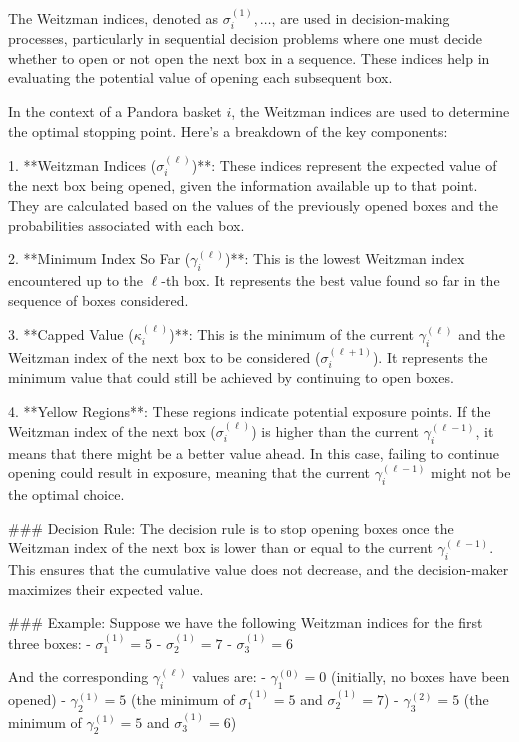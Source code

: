The Weitzman indices, denoted as \(\sigma_i^{(1)}, \dots\), are used in decision-making processes, particularly in sequential decision problems where one must decide whether to open or not open the next box in a sequence. These indices help in evaluating the potential value of opening each subsequent box.

In the context of a Pandora basket \(i\), the Weitzman indices are used to determine the optimal stopping point. Here's a breakdown of the key components:

1. **Weitzman Indices (\(\sigma_i^{(\ell)}\))**: These indices represent the expected value of the next box being opened, given the information available up to that point. They are calculated based on the values of the previously opened boxes and the probabilities associated with each box.

2. **Minimum Index So Far (\(\gamma_i^{(\ell)}\))**: This is the lowest Weitzman index encountered up to the \(\ell\)-th box. It represents the best value found so far in the sequence of boxes considered.

3. **Capped Value (\(\kappa_i^{(\ell)}\))**: This is the minimum of the current \(\gamma_i^{(\ell)}\) and the Weitzman index of the next box to be considered (\(\sigma_i^{(\ell+1)}\)). It represents the minimum value that could still be achieved by continuing to open boxes.

4. **Yellow Regions**: These regions indicate potential exposure points. If the Weitzman index of the next box (\(\sigma_i^{(\ell)}\)) is higher than the current \(\gamma_i^{(\ell-1)}\), it means that there might be a better value ahead. In this case, failing to continue opening could result in exposure, meaning that the current \(\gamma_i^{(\ell-1)}\) might not be the optimal choice.

### Decision Rule:
The decision rule is to stop opening boxes once the Weitzman index of the next box is lower than or equal to the current \(\gamma_i^{(\ell-1)}\). This ensures that the cumulative value does not decrease, and the decision-maker maximizes their expected value.

### Example:
Suppose we have the following Weitzman indices for the first three boxes:
- \(\sigma_1^{(1)} = 5\)
- \(\sigma_2^{(1)} = 7\)
- \(\sigma_3^{(1)} = 6\)

And the corresponding \(\gamma_i^{(\ell)}\) values are:
- \(\gamma_1^{(0)} = 0\) (initially, no boxes have been opened)
- \(\gamma_2^{(1)} = 5\) (the minimum of \(\sigma_1^{(1)} = 5\) and \(\sigma_2^{(1)} = 7\))
- \(\gamma_3^{(2)} = 5\) (the minimum of \(\gamma_2^{(1)} = 5\) and \(\sigma_3^{(1)} = 6\))

